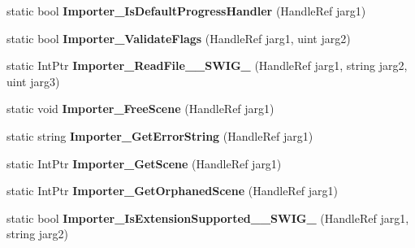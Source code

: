 \begin{DoxyCompactItemize}
\item 
\hypertarget{class_assimp_p_i_n_v_o_k_e_ab81d06e8ff15f2afb971eb8bb34dd813}{static bool {\bfseries Importer\+\_\+\+Is\+Default\+Progress\+Handler} (Handle\+Ref jarg1)}\label{class_assimp_p_i_n_v_o_k_e_ab81d06e8ff15f2afb971eb8bb34dd813}

\item 
\hypertarget{class_assimp_p_i_n_v_o_k_e_aea044053287551130d59a892edab70f3}{static bool {\bfseries Importer\+\_\+\+Validate\+Flags} (Handle\+Ref jarg1, uint jarg2)}\label{class_assimp_p_i_n_v_o_k_e_aea044053287551130d59a892edab70f3}

\item 
\hypertarget{class_assimp_p_i_n_v_o_k_e_a7d43b2d0766e0496fdbd230abf4b9134}{static Int\+Ptr {\bfseries Importer\+\_\+\+Read\+File\+\_\+\+\_\+\+S\+W\+I\+G\+\_} (Handle\+Ref jarg1, string jarg2, uint jarg3)}\label{class_assimp_p_i_n_v_o_k_e_a7d43b2d0766e0496fdbd230abf4b9134}

\item 
\hypertarget{class_assimp_p_i_n_v_o_k_e_a10af3b14d854fafed4465d0e95519ea6}{static void {\bfseries Importer\+\_\+\+Free\+Scene} (Handle\+Ref jarg1)}\label{class_assimp_p_i_n_v_o_k_e_a10af3b14d854fafed4465d0e95519ea6}

\item 
\hypertarget{class_assimp_p_i_n_v_o_k_e_a5ee376824b02165e22668ce8cb13bce3}{static string {\bfseries Importer\+\_\+\+Get\+Error\+String} (Handle\+Ref jarg1)}\label{class_assimp_p_i_n_v_o_k_e_a5ee376824b02165e22668ce8cb13bce3}

\item 
\hypertarget{class_assimp_p_i_n_v_o_k_e_a53afaf7c35d33aac6529a68c3196f54f}{static Int\+Ptr {\bfseries Importer\+\_\+\+Get\+Scene} (Handle\+Ref jarg1)}\label{class_assimp_p_i_n_v_o_k_e_a53afaf7c35d33aac6529a68c3196f54f}

\item 
\hypertarget{class_assimp_p_i_n_v_o_k_e_a63e5737f855fa87766ebafb12e2bfdd8}{static Int\+Ptr {\bfseries Importer\+\_\+\+Get\+Orphaned\+Scene} (Handle\+Ref jarg1)}\label{class_assimp_p_i_n_v_o_k_e_a63e5737f855fa87766ebafb12e2bfdd8}

\item 
\hypertarget{class_assimp_p_i_n_v_o_k_e_a9a0d8ac3f14270c4e9dbfcacc19f4c7a}{static bool {\bfseries Importer\+\_\+\+Is\+Extension\+Supported\+\_\+\+\_\+\+S\+W\+I\+G\+\_} (Handle\+Ref jarg1, string jarg2)}\label{class_assimp_p_i_n_v_o_k_e_a9a0d8ac3f14270c4e9dbfcacc19f4c7a}


\end{DoxyCompactItemize}
